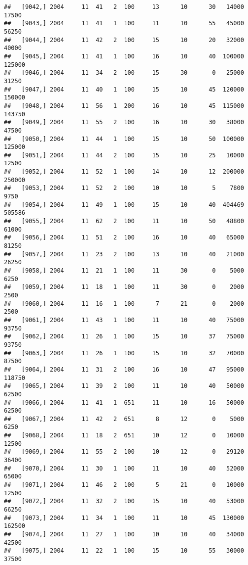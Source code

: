 \documentclass{article}\usepackage[]{graphicx}\usepackage[]{color}
\makeatletter
\newenvironment{kframe}{%
 \def\at@end@of@kframe{}%
 \ifinner\ifhmode%
  \def\at@end@of@kframe{\end{minipage}}%
  \begin{minipage}{\columnwidth}%
 \fi\fi%
 \def\FrameCommand##1{\hskip\@totalleftmargin \hskip-\fboxsep
 \colorbox{shadecolor}{##1}\hskip-\fboxsep
     \hskip-\linewidth \hskip-\@totalleftmargin \hskip\columnwidth}%
 \MakeFramed {\advance\hsize-\width
   \@totalleftmargin\z@ \linewidth\hsize
   \@setminipage}}%
 {\par\unskip\endMakeFramed%
 \at@end@of@kframe}
\newenvironment{knitrout}{}{} %
\makeatother
\begin{document}
\begin{knitrout}
\begin{kframe}
\begin{verbatim}
##   [9042,] 2004     11  41   2  100     13      10      30   14000   17500
##   [9043,] 2004     11  41   1  100     11      10      55   45000   56250
##   [9044,] 2004     11  42   2  100     15      10      20   32000   40000
##   [9045,] 2004     11  41   1  100     16      10      40  100000  125000
##   [9046,] 2004     11  34   2  100     15      30       0   25000   31250
##   [9047,] 2004     11  40   1  100     15      10      45  120000  150000
##   [9048,] 2004     11  56   1  200     16      10      45  115000  143750
##   [9049,] 2004     11  55   2  100     16      10      30   38000   47500
##   [9050,] 2004     11  44   1  100     15      10      50  100000  125000
##   [9051,] 2004     11  44   2  100     15      10      25   10000   12500
##   [9052,] 2004     11  52   1  100     14      10      12  200000  250000
##   [9053,] 2004     11  52   2  100     10      10       5    7800    9750
##   [9054,] 2004     11  49   1  100     15      10      40  404469  505586
##   [9055,] 2004     11  62   2  100     11      10      50   48800   61000
##   [9056,] 2004     11  51   2  100     16      10      40   65000   81250
##   [9057,] 2004     11  23   2  100     13      10      40   21000   26250
##   [9058,] 2004     11  21   1  100     11      30       0    5000    6250
##   [9059,] 2004     11  18   1  100     11      30       0    2000    2500
##   [9060,] 2004     11  16   1  100      7      21       0    2000    2500
##   [9061,] 2004     11  43   1  100     11      10      40   75000   93750
##   [9062,] 2004     11  26   1  100     15      10      37   75000   93750
##   [9063,] 2004     11  26   1  100     15      10      32   70000   87500
##   [9064,] 2004     11  31   2  100     16      10      47   95000  118750
##   [9065,] 2004     11  39   2  100     11      10      40   50000   62500
##   [9066,] 2004     11  41   1  651     11      10      16   50000   62500
##   [9067,] 2004     11  42   2  651      8      12       0    5000    6250
##   [9068,] 2004     11  18   2  651     10      12       0   10000   12500
##   [9069,] 2004     11  55   2  100     10      12       0   29120   36400
##   [9070,] 2004     11  30   1  100     11      10      40   52000   65000
##   [9071,] 2004     11  46   2  100      5      21       0   10000   12500
##   [9072,] 2004     11  32   2  100     15      10      40   53000   66250
##   [9073,] 2004     11  34   1  100     11      10      45  130000  162500
##   [9074,] 2004     11  27   1  100     10      10      40   34000   42500
##   [9075,] 2004     11  22   1  100     15      10      55   30000   37500

\end{verbatim}
\end{kframe}
\end{knitrout}
\end{document}

